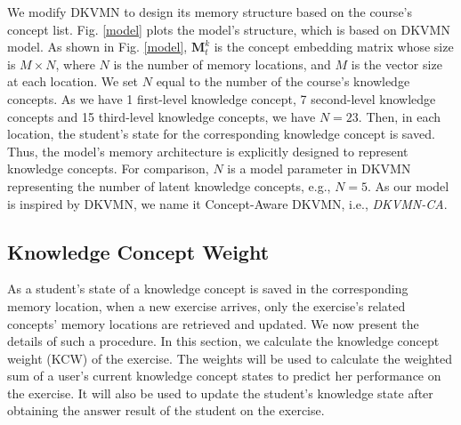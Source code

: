 \documentclass{edm_template}
\begin{document}
We modify DKVMN to design its memory structure based on the course's concept list. Fig. \ref{model} plots the model's structure, which is based on DKVMN model\cite{dkvmn}. As shown in Fig. \ref{model}, $\textbf{M}_t^k$ is the concept embedding matrix whose size is $M \times N$, where $N$ is the number of memory locations, and $M$ is the vector size at each location. We set $N$ equal to the number of the course's knowledge concepts. As we have 1 first-level knowledge concept, 7 second-level knowledge concepts and 15 third-level knowledge concepts, we have $N=23$. Then, in each location, the student's state for the corresponding knowledge concept is saved. Thus, the model's memory architecture is explicitly designed to represent knowledge concepts. For comparison, $N$ is a model parameter in DKVMN representing the number of latent knowledge concepts, e.g., $N=5$. As our model is inspired by DKVMN, we name it Concept-Aware DKVMN, i.e., \emph{DKVMN-CA}.

\subsection{Knowledge Concept Weight}

As a student's state of a knowledge concept is saved in the corresponding memory location, when a new exercise arrives, only the exercise's related concepts' memory locations are retrieved and updated. We now present the details of such a procedure. In this section, we calculate the knowledge concept weight (KCW) of the exercise. The weights will be used to calculate the weighted sum of a user's current knowledge concept states to predict her performance on the exercise. It will also be used to update the student's knowledge state after obtaining the answer result of the student on the exercise.
\end{document}
